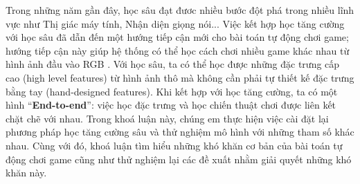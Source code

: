 Trong những năm gần đây, học sâu đạt đươc nhiều bước đột phá trong nhiều lĩnh vực như Thị giác máy tính, Nhận diện giọng nói...  
Việc kết hợp học tăng cường với học sâu đã dẫn đến một hướng tiếp cận mới cho bài toán tự động chơi game; hướng tiếp cận này giúp hệ thống có thể học cách chơi nhiều game khác nhau từ hình ảnh đầu vào RGB \cite{mnihdqn2015}. 
Với học sâu, ta có thể học được những đặc trưng cấp cao (high level features) từ hình ảnh thô mà không cần phải tự thiết kế đặc trưng bằng tay (hand-designed features). 
Khi kết hợp với học tăng cường, ta có một hình ``\textbf{End-to-end}'': việc học đặc trưng và học chiến thuật chơi được liên kết chặt chẽ với nhau. 
Trong khoá luận này, chúng em thực hiện việc cài đặt lại phương pháp học tăng cường sâu và thử nghiệm mô hình với những tham số khác nhau. 
Cùng với đó, khoá luận tìm hiểu những khó khăn cơ bản của bài toán tự động chơi game cũng như thử nghiệm lại các đề xuất nhằm giải quyết những khó khăn này.